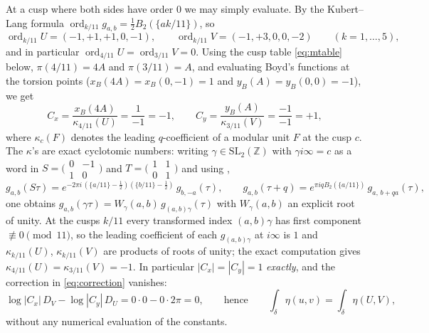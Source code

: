 At a cusp where both sides have order $0$ we may simply evaluate. By the
Kubert--Lang formula $\operatorname{ord}_{k/11} g_{a,b}
= \tfrac12 B_2(\{ak/11\})$, so
\begin{equation}\label{eq:ordUV}
  \operatorname{ord}_{k/11} U = (-1, +1, +1, 0, -1), \qquad
  \operatorname{ord}_{k/11} V = (-1, +3, 0, 0, -2) \qquad (k = 1, \dots, 5),
\end{equation}
and in particular $\operatorname{ord}_{4/11} U = \operatorname{ord}_{3/11} V = 0$.
Using the cusp table \eqref{eq:mtable} below, $\pi(4/11) = 4A$ and
$\pi(3/11) = A$, and evaluating Boyd's functions at the torsion points
($x_B(4A) = x_B(0,-1) = 1$ and $y_B(A) = y_B(0,0) = -1$), we get
\begin{equation}\label{eq:constants}
  C_x = \frac{x_B(4A)}{\kappa_{4/11}(U)} = \frac{1}{-1} = -1, \qquad
  C_y = \frac{y_B(A)}{\kappa_{3/11}(V)} = \frac{-1}{-1} = +1,
\end{equation}
where $\kappa_c(F)$ denotes the leading $q$-coefficient of a modular unit $F$
at the cusp $c$. The $\kappa$'s are exact cyclotomic numbers: writing
$\gamma \in \mathrm{SL}_2(\mathbb Z)$ with $\gamma i\infty = c$ as a word in
$S = \bigl(\begin{smallmatrix}0&-1\\1&0\end{smallmatrix}\bigr)$ and
$T = \bigl(\begin{smallmatrix}1&1\\0&1\end{smallmatrix}\bigr)$ and using
\cite[Lemma~4 and (3)]{Brunault},
\begin{equation}\label{eq:STlaws}
  g_{a,b}(S\tau) = e^{-2\pi i\,(\{a/11\}-\frac12)(\{b/11\}-\frac12)}\, g_{b,-a}(\tau),
  \qquad
  g_{a,b}(\tau+q) = e^{\pi i q B_2(\{a/11\})}\, g_{a,\,b+qa}(\tau),
\end{equation}
one obtains $g_{a,b}(\gamma\tau) = W_\gamma(a,b)\, g_{(a,b)\gamma}(\tau)$ with
$W_\gamma(a,b)$ an explicit root of unity. At the cusps $k/11$ every
transformed index $(a,b)\gamma$ has first component $\not\equiv 0 \pmod{11}$,
so the leading coefficient of each $g_{(a,b)\gamma}$ at $i\infty$ is $1$ and
$\kappa_{k/11}(U)$, $\kappa_{k/11}(V)$ are products of roots of unity; the
exact computation gives $\kappa_{4/11}(U) = \kappa_{3/11}(V) = -1$. In
particular $|C_x| = |C_y| = 1$ \emph{exactly}, and the correction
in \eqref{eq:correction} vanishes:
\begin{equation}\label{eq:corrvanish}
  \log|C_x|\, D_V - \log|C_y|\, D_U = 0\cdot 0 - 0\cdot 2\pi = 0,
  \qquad\text{hence}\qquad
  \int_\delta \eta(u,v) = \int_\delta \eta(U,V),
\end{equation}
without any numerical evaluation of the constants.

